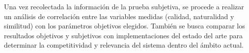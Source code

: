 Una vez recolectada la información de la prueba subjetiva, se procede a realizar un análisis de correlación entre las variables medidas (calidad, naturalidad y similitud) con los parámetros objetivos elegidos. También se busca comparar los resultados objetivos y subjetivos con implementaciones del estado del arte para determinar la competitividad y relevancia del sistema dentro del ámbito actual.